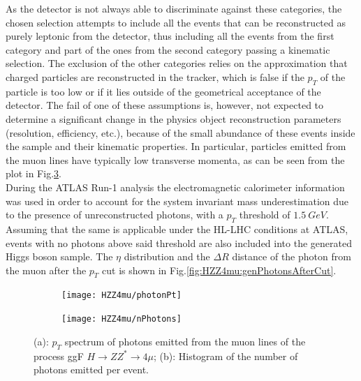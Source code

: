 \documentclass[a4paper,twoside,12pt]{article}
\begin{document}
As the detector is not always able to discriminate against these categories, the chosen selection attempts to include all the events that can be reconstructed as purely leptonic from
the detector, thus including all the events
from the first category and part of the ones from the second category passing a kinematic 
selection. The exclusion of the other categories relies on the approximation that charged
particles are reconstructed in the tracker, which is false if the $p_{T}$ of the particle is 
too low or if it lies outside of the geometrical acceptance of the detector. The fail of one 
of these assumptions is, however, not expected to determine a significant change in the
physics object reconstruction parameters (resolution, efficiency, etc.), because of the
small abundance of these events inside the sample and their kinematic properties. 
In particular, particles emitted from the muon lines have typically low transverse momenta, as can be 
seen from the plot in Fig.\ref{fig:HZZ4mu:genPhotons}. \\

During the ATLAS Run-1 analysis the electromagnetic calorimeter information was used
in order to account for the system invariant mass underestimation due to the presence of
unreconstructed photons, with a $p_T$ threshold of $1.5\ GeV$\cite{HZZ4mu_run1}. Assuming that the same
is applicable under the HL-LHC conditions at ATLAS, events with no photons above said 
threshold are also included into the generated Higgs boson sample. The $\eta$ distribution
and the $\Delta R$ distance of the photon from the muon after the $p_T$ cut is shown in Fig.\ref{fig:HZZ4mu:genPhotonsAfterCut}.\\

\begin{figure}
\centering
\begin{subfigure}{.5\textwidth}
  \centering
  \texttt{[image: HZZ4mu/photonPt]}
  \caption{}
  \label{fig:HZZ4mu:photonPt}
\end{subfigure}%
\begin{subfigure}{.5\textwidth}
  \centering
  \texttt{[image: HZZ4mu/nPhotons]}
  \caption{}
  \label{fig:HZZ4mu:nPhotons}
\end{subfigure}
\caption{(a): $p_T$ spectrum of photons emitted from the muon lines of the process 
	ggF $H \rightarrow ZZ^* \rightarrow 4\mu$; 
	(b): Histogram of the number of photons emitted per event.}
\label{fig:HZZ4mu:genPhotons}
\end{figure}
\end{document}
